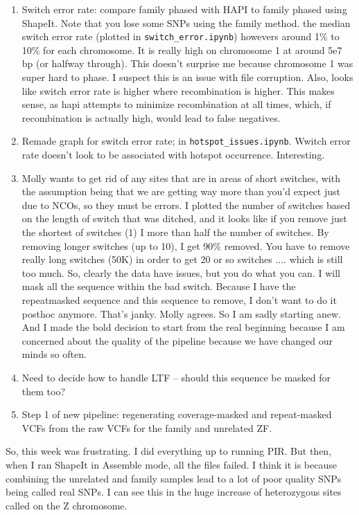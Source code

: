 \documentclass[idxtotoc,hyperref,openany,oneside]{labbook} %
\begin{document}
\begin{enumerate}
\item Switch error rate: compare family phased with HAPI to family phased using ShapeIt. Note that you lose some SNPs using the family method. the median switch error rate (plotted in \verb+switch_error.ipynb+) howevers around 1\% to 10\% for each chromosome. It is really high on chromosome 1 at around 5e7 bp (or halfway through). This doesn't surprise me because chromosome 1 was super hard to phase. I suspect this is an issue with file corruption. Also, looks like switch error rate is higher where recombination is higher. This makes sense, as hapi attempts to minimize recombination at all times, which, if recombination is actually high, would lead to false negatives.
\item Remade graph for switch error rate; in \verb+hotspot_issues.ipynb+. Wwitch error rate doesn't look to be associated with hotspot occurrence. Interesting.
\item Molly wants to get rid of any sites that are in areas of short switches, with the assumption being that we are getting way more than you'd expect just due to NCOs, so they must be errors. I plotted the number of switches based on the length of switch that was ditched, and it looks like if you remove just the shortest of switches (1) I more than half the number of switches. By removing longer switches (up to 10), I get 90\% removed. You have to remove really long switches (50K) in order to get 20 or so switches .... which is still too much. So, clearly the data have issues, but you do what you can. I will mask all the sequence within the bad switch. Because I have the repeatmasked sequence and this sequence to remove, I don't want to do it posthoc anymore. That's janky. Molly agrees. So I am sadly starting anew. And I made the bold decision to start from the real beginning because I am concerned about the quality of the pipeline because we have changed our minds so often.
\item Need to decide how to handle LTF -- should this sequence be masked for them too?
\item Step 1 of new pipeline: regenerating coverage-masked and repeat-masked VCFs from the raw VCFs for the family and unrelated ZF.
\end{enumerate}

So, this week was frustrating. I did everything up to running PIR. But then, when I ran ShapeIt in Assemble mode, all the files failed. I think it is because combining the unrelated and family samples lead to a lot of poor quality SNPs being called real SNPs. I can see this in the huge increase of heterozygous sites called on the Z chromosome.
\end{document}

